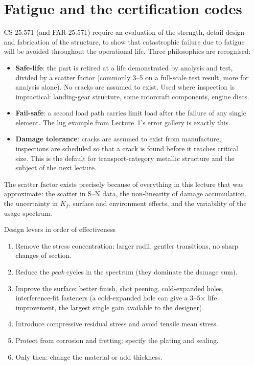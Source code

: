 \documentclass[11pt,a4paper]{article}
\begin{document}
\section{Fatigue and the certification codes}

CS-25.571 (and FAR 25.571) require an evaluation of the strength, detail design and fabrication of the structure, to show that catastrophic failure due to fatigue will be avoided throughout the operational life. Three philosophies are recognised:
\begin{itemize}[nosep]
  \item \textbf{Safe-life}: the part is retired at a life demonstrated by analysis and test, divided by a scatter factor (commonly 3--5 on a full-scale test result, more for analysis alone). No cracks are assumed to exist. Used where inspection is impractical: landing-gear structure, some rotorcraft components, engine discs.
  \item \textbf{Fail-safe}: a second load path carries limit load after the failure of any single element. The lug example from Lecture~1's error gallery is exactly this.
  \item \textbf{Damage tolerance}: cracks are assumed to exist from manufacture; inspections are scheduled so that a crack is found before it reaches critical size. This is the default for transport-category metallic structure and the subject of the next lecture.
\end{itemize}
The scatter factor exists precisely because of everything in this lecture that was approximate: the scatter in S--N data, the non-linearity of damage accumulation, the uncertainty in $K_f$, surface and environment effects, and the variability of the usage spectrum.

\begin{aerobox}{Design levers in order of effectiveness}
\begin{enumerate}[nosep]
  \item Remove the stress concentration: larger radii, gentler transitions, no sharp changes of section.
  \item Reduce the \emph{peak} cycles in the spectrum (they dominate the damage sum).
  \item Improve the surface: better finish, shot peening, cold-expanded holes, interference-fit fasteners (a cold-expanded hole can give a 3--5$\times$ life improvement, the largest single gain available to the designer).
  \item Introduce compressive residual stress and avoid tensile mean stress.
  \item Protect from corrosion and fretting; specify the plating and sealing.
  \item Only then: change the material or add thickness.
\end{enumerate}
\end{aerobox}
\end{document}
